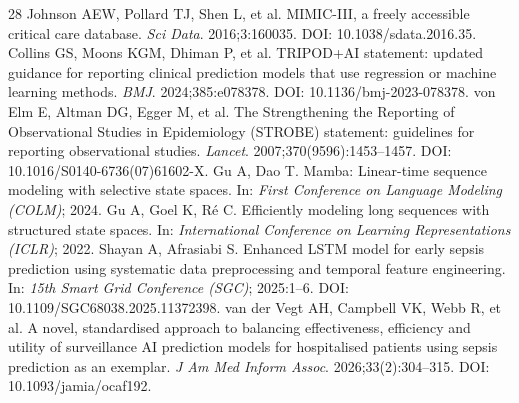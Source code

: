 \documentclass[10pt,twocolumn,a4paper]{article}
\begin{document}
\begin{thebibliography}{28}
 Johnson AEW, Pollard TJ, Shen L, et al. MIMIC-III, a freely accessible critical care database. \textit{Sci Data}. 2016;3:160035. DOI: 10.1038/sdata.2016.35.
 Collins GS, Moons KGM, Dhiman P, et al. TRIPOD+AI statement: updated guidance for reporting clinical prediction models that use regression or machine learning methods. \textit{BMJ}. 2024;385:e078378. DOI: 10.1136/bmj-2023-078378.
 von Elm E, Altman DG, Egger M, et al. The Strengthening the Reporting of Observational Studies in Epidemiology (STROBE) statement: guidelines for reporting observational studies. \textit{Lancet}. 2007;370(9596):1453--1457. DOI: 10.1016/S0140-6736(07)61602-X.
 Gu A, Dao T. Mamba: Linear-time sequence modeling with selective state spaces. In: \textit{First Conference on Language Modeling (COLM)}; 2024.
 Gu A, Goel K, Ré C. Efficiently modeling long sequences with structured state spaces. In: \textit{International Conference on Learning Representations (ICLR)}; 2022.
 Shayan A, Afrasiabi S. Enhanced LSTM model for early sepsis prediction using systematic data preprocessing and temporal feature engineering. In: \textit{15th Smart Grid Conference (SGC)}; 2025:1--6. DOI: 10.1109/SGC68038.2025.11372398.
 van der Vegt AH, Campbell VK, Webb R, et al. A novel, standardised approach to balancing effectiveness, efficiency and utility of surveillance AI prediction models for hospitalised patients using sepsis prediction as an exemplar. \textit{J Am Med Inform Assoc}. 2026;33(2):304--315. DOI: 10.1093/jamia/ocaf192.
\end{thebibliography}
\end{document}
